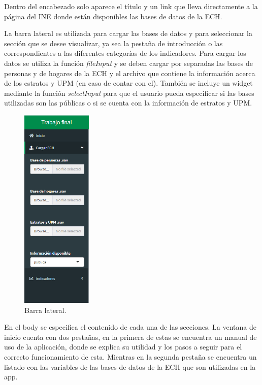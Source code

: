 \documentclass[12pt,twoside,spanish,a4paper]{book}\usepackage[]{graphicx}\usepackage[]{color}
\begin{document}
Dentro del encabezado solo aparece el título y un link que lleva directamente a la página del INE donde están disponibles las bases de datos de la ECH.

La barra lateral es utilizada para cargar las bases de datos y para seleccionar la sección que se desee visualizar, ya sea la pestaña de introducción o las correspondientes a las diferentes categorías de los indicadores. Para cargar los datos se utiliza la función \textit{fileInput} y se deben cargar por separadas las bases de personas y de hogares de la ECH y el archivo que contiene la información acerca de los estratos y UPM (en caso de contar con el). También se incluye un widget mediante la función \textit{selectInput} para que el usuario pueda especificar si las bases utilizadas son las públicas o si se cuenta con la información de estratos y UPM.

\begin{figure}[htb]
\begin{center}
\includegraphics[width=0.30\textwidth]{img/Barra_lateral.PNG}
\caption{Barra lateral. \label{lateral}}
\end{center}
\end{figure}

En el body se especifica el contenido de cada una de las secciones. La ventana de inicio cuenta con dos pestañas, en la primera de estas se encuentra un manual de uso de la aplicación, donde se explica su utilidad y los pasos a seguir para el correcto funcionamiento de esta. Mientras en la segunda pestaña se encuentra un listado con las variables de las bases de datos de la ECH que son utilizadas en la app.
\end{document}
